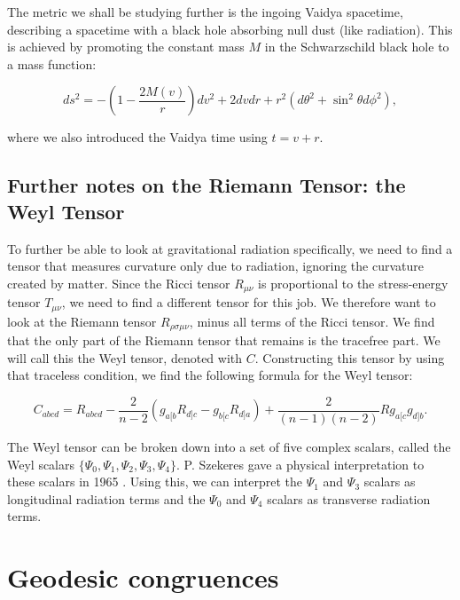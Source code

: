 \documentclass[twoside, openright]{RadboudReport}
\newcommand{\mn}{{\mu\nu}}
\begin{document}
The metric we shall be studying further is the ingoing Vaidya spacetime, describing a spacetime with a black hole absorbing null dust (like radiation). This is achieved by promoting the constant mass $M$ in the Schwarzschild black hole to a mass function:

\begin{equation}
	ds^2=-\left(1-\frac{2M\left(v\right)}{r}\right)dv^2+2dvdr+r^2\left(d\theta^2+\sin^2\theta d\phi^2\right),
	\label{eq:vaidyametric}
\end{equation}

where we also introduced the Vaidya time using $t = v + r$.\newline

\subsection{Further notes on the Riemann Tensor: the Weyl Tensor}

To further be able to look at gravitational radiation specifically, we need to find a tensor that measures curvature only due to radiation, ignoring the curvature created by matter. Since the Ricci tensor $R_\mn$ is proportional to the stress-energy tensor $T_\mn$, we need to find a different tensor for this job. We therefore want to look at the Riemann tensor $R_{\rho\sigma\mu\nu}$, minus all terms of the Ricci tensor. We find that the only part of the Riemann tensor that remains is the tracefree part. We will call this the Weyl tensor, denoted with $C$. Constructing this tensor by using that traceless condition, we find the following formula for the Weyl tensor:

\begin{equation}
	C_{abcd} = R_{abcd} - \frac{2}{n-2} (g_{a[b}R_{d]c}-g_{b[c}R_{d]a}) + \frac{2}{(n-1)(n-2)}Rg_{a[c}g_{d]b}.
	\label{eq:Weyltensorgeneral}
\end{equation}

The Weyl tensor can be broken down into a set of five complex scalars, called the Weyl scalars $\{\Psi_0,\Psi_1,\Psi_2,\Psi_3,\Psi_4\}$. P. Szekeres gave a physical interpretation to these scalars in 1965 \cite{Szekeres1965-vu}. Using this, we can interpret the  $\Psi_1$ and $\Psi_3$ scalars as longitudinal radiation terms and the  $\Psi_0$ and $\Psi_4$ scalars as transverse radiation terms.

\section{Geodesic congruences}
\end{document}
